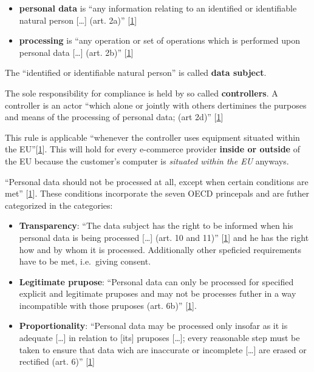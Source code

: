 \begin{itemize}
\item
  \textbf{personal data} is ``any information relating to an identified or identifiable natural person {[}\ldots{}{]} (art. 2a)''
  {[}\hyperref[references]{1}{]}
\item
  \textbf{processing} is ``any operation or set of operations which is performed upon personal data {[}\ldots{}{]} (art. 2b)''
  {[}\hyperref[references]{1}{]}
\end{itemize}

The ``identified or identifiable natural person'' is called \textbf{data subject}.

The sole responsibility for compliance is held by so called \textbf{controllers}.
A controller is an actor ``which alone or jointly with others dertimines the purposes and means of the processing of personal data; (art 2d)''
{[}\hyperref[references]{1}{]}

This rule is applicable ``whenever the controller uses equipment situated within the EU''{[}\hyperref[references]{1}{]}.
This will hold for every e-commerce provider \textbf{inside or outside} of the EU because the customer's computer is \emph{situated within the EU} anyways.

``Personal data should not be processed at all, except when certain conditions are met'' {[}\hyperref[references]{1}{]}.
These conditions incorporate the seven OECD princepals and are futher categorized in the categories:

\begin{itemize}
\item
\textbf{Transparency}: ``The data subject has the right to be informed when his personal data is being processed {[}\ldots{}{]} (art. 10 and 11)'' {[}\hyperref[references]{1}{]} and he has the right how and by whom it is processed.
Additionally other speficied requirements have to be met, i.e.~giving consent.
\item
\textbf{Legitimate prupose}: ``Personal data can only be processed for specified explicit and legitimate pruposes and may not be processes futher in a way incompatible with those pruposes (art. 6b)''
{[}\hyperref[references]{1}{]}.
\item
\textbf{Proportionality}: ``Personal data may be processed only insofar as it is adequate {[}\ldots{}{]} in relation to {[}its{]} pruposes {[}\ldots{}{]}; every reasonable step must be taken to ensure that data wich are inaccurate or incomplete {[}\ldots{}{]} are erased or rectified (art. 6)'' {[}\hyperref[references]{1}{]}
\end{itemize}

